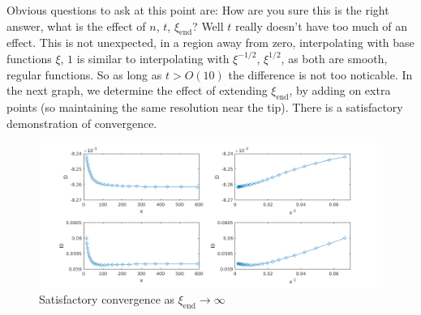 \documentclass{jfm}
\begin{document}
Obvious questions to ask at this point are: How are you sure this is the right
answer, what is the effect of $n$, $t$, $\xi_{\mathrm{end}}$? Well $t$ really
doesn't have too much of an effect. This is not unexpected, in a region away
from zero, interpolating with base functions $\xi$, $1$ is similar to 
interpolating with $\xi^{-1/2}$, $\xi^{1/2}$, as both are smooth, regular 
functions. So as long as $t > O(10)$ the difference is not too noticable.
In the next graph, we determine the effect of extending $\xi_{\mathrm{end}}$,
by adding on extra points (so maintaining the same resolution near the tip).
There is a satisfactory demonstration of convergence.
\begin{figure}
  \centerline{\includegraphics[scale=0.5]{./../../Graphs/xend-march.png}}
  \caption{Satisfactory convergence as $\xi_{\mathrm{end}} \to \infty$}
\end{figure}
\end{document}
